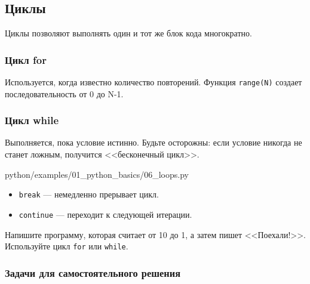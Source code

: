 \subsection{Циклы}

Циклы позволяют выполнять один и тот же блок кода многократно.

\subsubsection*{Цикл for}
Используется, когда известно количество повторений. Функция \texttt{range(N)} создает последовательность от 0 до N-1.

\subsubsection*{Цикл while}
Выполняется, пока условие истинно. Будьте осторожны: если условие никогда не станет ложным, получится <<бесконечный цикл>>.

\begin{codefile}[python]{python/examples/01_python_basics/06_loops.py}
\end{codefile}

\begin{itemize}
    \item \texttt{break} — немедленно прерывает цикл.
    \item \texttt{continue} — переходит к следующей итерации.
\end{itemize}

\begin{taskbox}
Напишите программу, которая считает от 10 до 1, а затем пишет <<Поехали!>>. Используйте цикл \texttt{for} или \texttt{while}.
\end{taskbox}

\subsubsection*{Задачи для самостоятельного решения}

